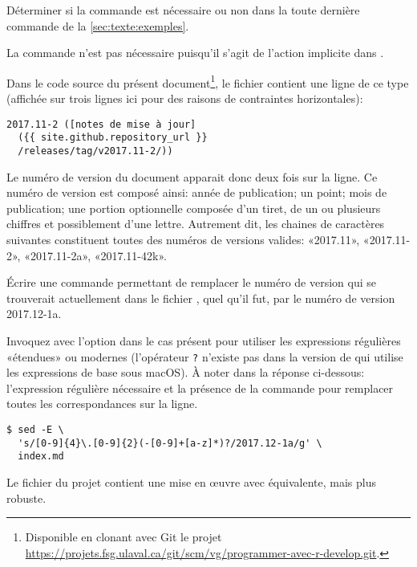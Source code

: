\begin{exercice}
  Déterminer si la commande  est nécessaire ou non dans la
  toute dernière commande  de la
  \autoref{sec:texte:exemples}.
  \begin{sol}
    La commande  n'est pas nécessaire puisqu'il s'agit de
    l'action implicite dans .
  \end{sol}
\end{exercice}

\begin{exercice}
  Dans le code source du présent document\footnote{%
    Disponible en clonant avec Git le projet
    \url{https://projets.fsg.ulaval.ca/git/scm/vg/programmer-avec-r-develop.git}.}, %
  le fichier  contient une ligne de ce type
  (affichée sur trois lignes ici pour des raisons de contraintes
  horizontales):
  \begin{Schunk}
\begin{Verbatim}
2017.11-2 ([notes de mise à jour]
  ({{ site.github.repository_url }}
  /releases/tag/v2017.11-2/))
\end{Verbatim}
  \end{Schunk}
  Le numéro de version du document apparait donc deux fois sur la
  ligne. Ce numéro de version est composé ainsi: année de publication;
  un point; mois de publication; une portion optionnelle composée d'un
  tiret, de un ou plusieurs chiffres et possiblement d'une lettre.
  Autrement dit, les chaines de caractères suivantes constituent
  toutes des numéros de versions valides: «2017.11», «2017.11-2»,
  «2017.11-2a», «2017.11-42k».

  Écrire une commande  permettant de remplacer le numéro de
  version qui se trouverait actuellement dans le fichier
  , quel qu'il fut, par le numéro de version
  2017.12-1a.
  \begin{sol}
    Invoquez  avec l'option  dans le cas présent
    pour utiliser les expressions régulières «étendues» ou modernes
    (l'opérateur \verb=?= n'existe pas dans la version de 
    qui utilise les expressions de base sous macOS). À noter dans la
    réponse ci-dessous: l'expression régulière nécessaire et la
    présence de la commande  pour remplacer toutes les
    correspondances sur la ligne.
    \begin{Schunk}
\begin{Verbatim}
$ sed -E \
  's/[0-9]{4}\.[0-9]{2}(-[0-9]+[a-z]*)?/2017.12-1a/g' \
  index.md
\end{Verbatim}
    \end{Schunk}
    Le fichier  du projet contient une mise en
    œuvre avec  équivalente, mais plus robuste.
  \end{sol}
\end{exercice}


